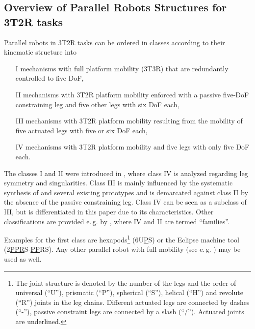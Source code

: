 \documentclass[robotics,article,submit,moreauthors,pdftex]{Definitions/mdpi}
\begin{document}
\subsection{Overview of Parallel Robots Structures for 3T2R tasks}
\label{sec:parrob_classification}

Parallel robots in 3T2R tasks can be ordered in classes according to their kinematic structure into
\begin{itemize}
	\item[I] mechanisms with full platform mobility (3T3R) that are redundantly controlled to five DoF,
	\item[II] mechanisms with 3T2R platform mobility enforced with a passive five-DoF constraining leg and five other legs with six DoF each,
	\item[III] mechanisms with 3T2R platform mobility resulting from the mobility of five actuated legs with five or six DoF each,
	\item[IV] mechanisms with 3T2R platform mobility and five legs with only five DoF each.
\end{itemize}

The classes I and II were introduced in \cite{Tale-MasoulehGos2011}, where class IV is analyzed regarding leg symmetry and singularities.
Class III is mainly influenced by the systematic synthesis of \cite{Gogu2008} and several existing prototypes and is demarcated against class II by the absence of the passive constraining leg.
Class IV can be seen as a subclass of III, but is differentiated in this paper due to its characteristics.
Other classifications are provided e.\,g. by \cite{HuangLiuChe2011}, where IV and II are termed ``families''.

Examples for the first class are hexapods\footnote{The joint structure is denoted by the number of the legs and the order of universal (``U''), prismatic (``P''), spherical (``S''), helical (``H'') and revolute (``R'') joints in the leg chains. Different actuated legs are connected by dashes (``-''), passive constraint legs are connected by a slash (``/''). Actuated joints are underlined.} (6U\underline{P}S) \cite{MerletPerDan2000} or the Eclipse \cite{HongKim2000} machine tool (2\underline{PPR}S-\underline{PP}RS).
Any other parallel robot with full mobility (see e.\,g. \cite{Merlet2006,Gogu2008,Zhang2009}) may be used as well.
\end{document}
